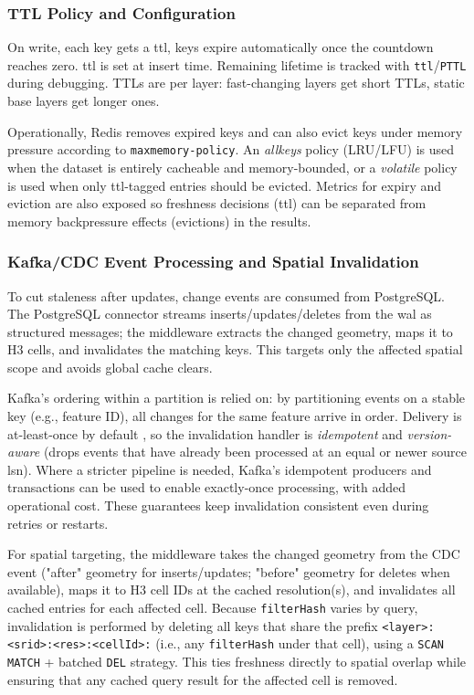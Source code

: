 \subsubsection{TTL Policy and Configuration}
On write, each key gets a \ac{ttl}, keys expire automatically once the countdown reaches zero. \ac{ttl} is set at insert time. Remaining lifetime is tracked with \texttt{\ac{ttl}}/\texttt{PTTL} during debugging. TTLs are per layer: fast-changing layers get short TTLs, static base layers get longer ones.

Operationally, Redis removes expired keys and can also evict keys under memory pressure according to \texttt{maxmemory-policy}. An \emph{allkeys} policy (LRU/LFU) is used when the dataset is entirely cacheable and memory-bounded, or a \emph{volatile} policy is used when only \ac{ttl}-tagged entries should be evicted. Metrics for expiry and eviction are also exposed so freshness decisions (\ac{ttl}) can be separated from memory backpressure effects (evictions) in the results.

\subsubsection{Kafka/CDC Event Processing and Spatial Invalidation}
To cut staleness after updates, change events are consumed from PostgreSQL. The PostgreSQL connector streams inserts/updates/deletes from the \ac{wal} as structured messages; the middleware extracts the changed geometry, maps it to H3 cells, and invalidates the matching keys. This targets only the affected spatial scope and avoids global cache clears.

Kafka’s ordering within a partition is relied on: by partitioning events on a stable key (e.g., feature ID), all changes for the same feature arrive in order. Delivery is at-least-once by default \cite{Kafka_4_1_Design}, so the invalidation handler is \emph{idempotent} and \emph{version-aware} (drops events that have already been processed at an equal or newer source \ac{lsn}). Where a stricter pipeline is needed, Kafka’s idempotent producers and transactions can be used to enable exactly-once processing, with added operational cost. These guarantees keep invalidation consistent even during retries or restarts.

For spatial targeting, the middleware takes the changed geometry from the CDC event ("after" geometry for inserts/updates; "before" geometry for deletes when available), maps it to H3 cell IDs at the cached resolution(s), and invalidates all cached entries for each affected cell. Because \texttt{filterHash} varies by query, invalidation is performed by deleting all keys that share the prefix \texttt{<layer>:<srid>:<res>:<cellId>:} (i.e., any \texttt{filterHash} under that cell), using a \texttt{SCAN MATCH} + batched \texttt{DEL} strategy. This ties freshness directly to spatial overlap while ensuring that any cached query result for the affected cell is removed.

